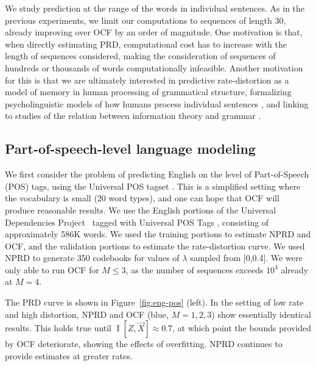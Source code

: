\documentclass[entropy,article,submit,moreauthors,pdftex,10pt,a4paper]{Definitions/mdpi}
\newcommand{\future}{\overrightarrow{X}}
\begin{document}

We study prediction at the range of the words in individual sentences.
As in the previous experiments, we limit our computations to sequences of length 30, already improving over OCF by an order of magnitude.
One motivation is that, when directly estimating PRD, computational cost has to increase with the length of sequences considered, making the consideration of sequences of hundreds or thousands of words computationally infeasible.
Another motivation for this is that we are ultimately interested in predictive rate-distortion as a model of memory in human processing of grammatical structure, formalizing psycholinguistic models of how humans process individual sentences \citep{gibson-linguistic-1998,futrell-noisy-context-2017}, and linking to studies of the relation between information theory and grammar \citep{koplenig2017statistical}.





\subsection{Part-of-speech-level language modeling}\label{sec:pos}

We first consider the problem of predicting English on the level of Part-of-Speech (POS) tags, using the Universal POS tagset \citep{petrov-universal-2012}. 
This is a simplified setting where the vocabulary is small (20 word types), and one can hope that OCF will produce reasonable results.
We use the English portions of the Universal Dependencies Project~\citep{nivre-universal-2017} tagged with Universal POS Tags \citep{petrov-universal-2012}, consisting of approximately 586K words.
We used the training portions to estimate NPRD and OCF, and the validation portions to estimate the rate-distortion curve.
We used NPRD to generate 350 codebooks for values of $\lambda$ sampled from [0,0.4].
We were only able to run OCF for $M \leq 3$, as the number of sequences exceeds $10^4$ already at $M=4$.


The PRD curve is shown in Figure~\ref{fig:eng-pos} (left).
In the setting of low rate and high distortion, NPRD and OCF (blue, $M=1,2,3$) show essentially identical results.
This holds true until $\operatorname{I}[Z, \future] \approx 0.7$, at which point the bounds provided by OCF deteriorate, showing the effects of overfitting.
NPRD continues to provide estimates at greater rates.
\end{document}
